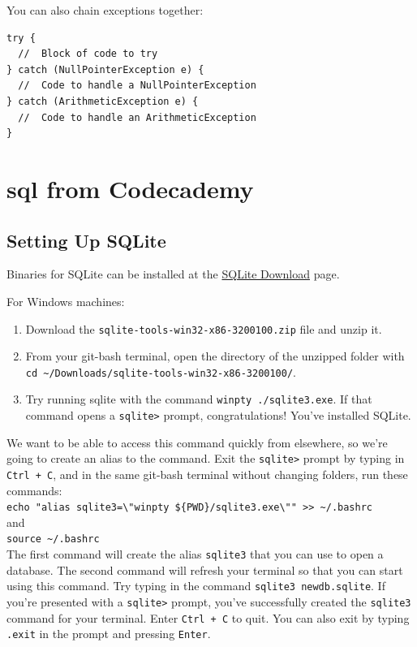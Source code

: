 \documentclass[a4paper, 12pt]{article}
\begin{document}
You can also chain exceptions together:
\begin{verbatim}
try {
  //  Block of code to try
} catch (NullPointerException e) {
  //  Code to handle a NullPointerException
} catch (ArithmeticException e) {
  //  Code to handle an ArithmeticException
}
\end{verbatim}


\section{sql from Codecademy}
\subsection{Setting Up SQLite}
Binaries for SQLite can be installed at the \href{https://www.sqlite.org/download.html}{SQLite Download} page.

For Windows machines:
\begin{enumerate}
\item Download the \verb|sqlite-tools-win32-x86-3200100.zip| file and unzip it.

\item From your git-bash terminal, open the directory of the unzipped folder with \verb|cd ~/Downloads/sqlite-tools-win32-x86-3200100/|.

\item Try running sqlite with the command \verb|winpty ./sqlite3.exe|. If that command opens a \verb|sqlite>| prompt, congratulations! You've installed SQLite.

\end{enumerate}
We want to be able to access this command quickly from elsewhere, so we're going to create an alias to the command. Exit the \verb|sqlite>| prompt by typing in \verb|Ctrl + C|, and in the same git-bash terminal without changing folders, run these commands:\\
\verb|echo "alias sqlite3=\"winpty ${PWD}/sqlite3.exe\"" >> ~/.bashrc|\\
and\\
\verb|source ~/.bashrc|\\
The first command will create the alias \verb|sqlite3| that you can use to open a database. The second command will refresh your terminal so that you can start using this command. Try typing in the command \verb|sqlite3 newdb.sqlite|. If you're presented with a \verb|sqlite>| prompt, you've successfully created the \verb|sqlite3| command for your terminal. Enter \verb|Ctrl + C| to quit. You can also exit by typing \verb|.exit| in the prompt and pressing \verb|Enter|.
\end{document}
